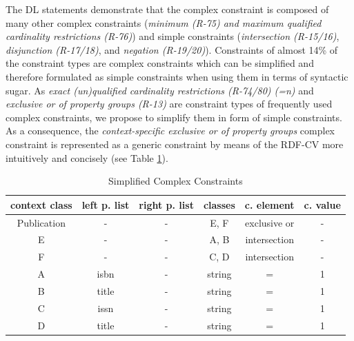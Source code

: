 \documentclass[a4paper,fontsize=11pt]{scrartcl}
\begin{document}
The DL statements demonstrate that the complex constraint is composed of many other complex constraints (\emph{minimum (R-75) and maximum qualified cardinality restrictions (R-76)}) and simple constraints (\emph{intersection (R-15/16)}, \emph{disjunction (R-17/18)}, and \emph{negation (R-19/20)}). Constraints of almost 14\% of the constraint types are complex constraints which can be simplified and therefore formulated as simple constraints when using them in terms of syntactic sugar. As \emph{exact (un)qualified cardinality restrictions (R-74/80) (=n)} and \emph{exclusive or of property groups (R-13)} are constraint types of frequently used complex constraints, we propose to simplify them in form of simple constraints. As a consequence, the \emph{context-specific exclusive or of property groups} complex constraint is represented as a generic constraint by means of the RDF-CV more intuitively and concisely (see Table \ref{tab:simplified-complex-constraints}).


\begin{table}[H]
  \scriptsize
  \sffamily
  \vspace{0cm}
	\caption{Simplified Complex Constraints}
	\label{tab:simplified-complex-constraints}
	\centering
		\begin{tabular}{c|c|c|c|c|c}
      \textbf{context class} & \textbf{left p. list} & \textbf{right p. list} & \textbf{classes} & \textbf{c. element} & \textbf{c. value} \\
      \hline
Publication & - & - & E, F & exclusive or & - \\
E & - & - & A, B & intersection & - \\
F & - & - & C, D & intersection & - \\
A & isbn & - & string & = & 1 \\
B & title & - & string & = & 1 \\
C & issn & - & string & = & 1 \\
D & title & - & string & = & 1 \\
		\end{tabular}
\end{table}
\end{document}
